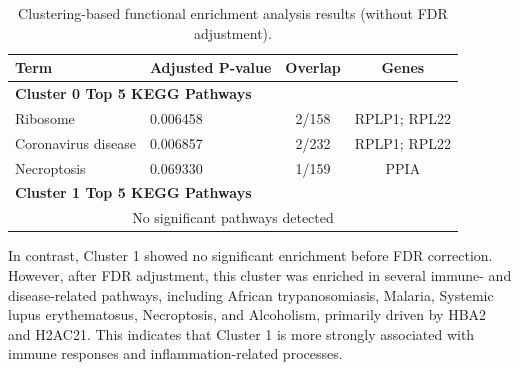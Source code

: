 \documentclass{article}
\begin{document}
        \begin{table}[H]

          \centering
          \caption{Clustering-based functional enrichment analysis results (without FDR adjustment).}
          \label{tab:cluster_enrich_raw}

          \begin{tabular}{@{}llcc@{}}
            \toprule
            \textbf{Term} & \textbf{Adjusted P-value} & \textbf{Overlap} & \textbf{Genes} \\ \midrule
            \multicolumn{4}{l}{\textbf{Cluster 0 Top 5 KEGG Pathways}} \\ 
            Ribosome & 0.006458 & 2/158 & RPLP1; RPL22 \\
            Coronavirus disease & 0.006857 & 2/232 & RPLP1; RPL22 \\
            Necroptosis & 0.069330 & 1/159 & PPIA \\ \midrule
            \multicolumn{4}{l}{\textbf{Cluster 1 Top 5 KEGG Pathways}} \\
            \multicolumn{4}{c}{No significant pathways detected} \\ \bottomrule
          \end{tabular}

        \end{table}

        In contrast, Cluster 1 showed no significant enrichment before FDR correction. However, after FDR adjustment, this cluster was enriched in several immune- and disease-related pathways, including African trypanosomiasis, Malaria, Systemic lupus erythematosus, Necroptosis, and Alcoholism, primarily driven by HBA2 and H2AC21. This indicates that Cluster 1 is more strongly associated with immune responses and inflammation-related processes.
\end{document}
